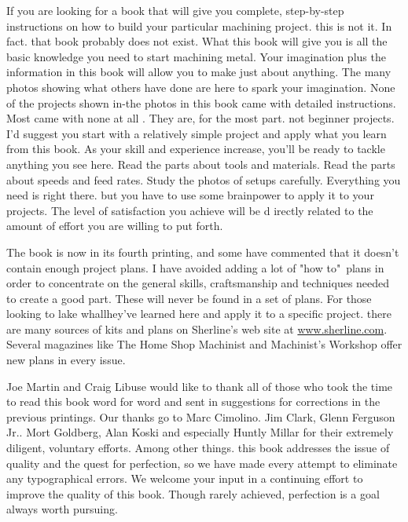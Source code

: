 If you are looking for a book that will give you complete, step-by-step
instructions on how to build your particular machining project. this is not it.
In fact. that book probably does not exist. What this book will give you is all
the basic knowledge you need to start machining metal. Your imagination plus the
information in this book will allow you to make just about anything. The many
photos showing what others have done are here to spark your imagination. None of
the projects shown in-the photos in this book came with detailed instructions.
Most came with none at all . They are, for the most part. not beginner projects.
I'd suggest you start with a relatively simple project and apply what you learn
from this book. As your skill and experience increase, you'll be ready to tackle
anything you see here. Read the parts about tools and materials. Read the parts
about speeds and feed rates. Study the photos of setups carefully. Everything
you need is right there. but you have to use some brainpower to apply it to your
projects. The level of satisfaction you achieve will be d irectly related to the
amount of effort you are willing to put forth.

The book is now in its fourth printing, and some have commented that it doesn't
contain enough project plans. I have avoided adding a lot of "how to"\ plans in
order to concentrate on the general skills, craftsmanship and techniques needed
to create a good part. These will never be found in a set of plans. For those
looking to lake whallhey've learned here and apply it to a specific project.
there are many sources of kits and plans on Sherline's web site at
\url{www.sherline.com}. Several magazines like The Home Shop Machinist and
Machinist's Workshop offer new plans in every issue.


Joe Martin and Craig Libuse would like to thank all of those who took the time
to read this book word for word and sent in suggestions for corrections in the
previous printings. Our thanks go to Marc Cimolino. Jim Clark, Glenn Ferguson
Jr.. Mort Goldberg, Alan Koski and especially Huntly Millar for their extremely
diligent, voluntary efforts. Among other things. this book addresses the issue
of quality and the quest for perfection, so we have made every attempt to
eliminate any typographical errors. We welcome your input in a continuing effort
to improve the quality of this book. Though rarely achieved, perfection is a
goal always worth pursuing.

\secup
\secup
